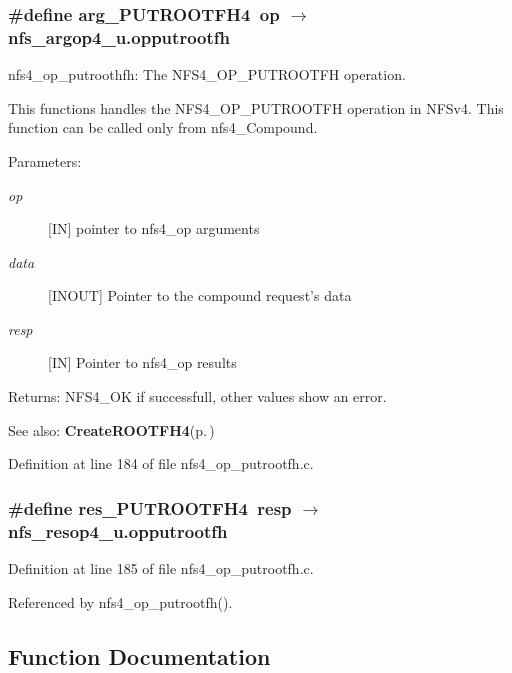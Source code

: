 \subsubsection{\setlength{\rightskip}{0pt plus 5cm}\#define arg\_\-PUTROOTFH4\ op $\rightarrow$ nfs\_\-argop4\_\-u.opputrootfh}\label{nfs4__op__putrootfh_8c_a0}


nfs4\_\-op\_\-putroothfh: The NFS4\_\-OP\_\-PUTROOTFH operation.

This functions handles the NFS4\_\-OP\_\-PUTROOTFH operation in NFSv4. This function can be called only from nfs4\_\-Compound.

\begin{Desc}
\item[Parameters:]
\begin{description}
\item[{\em op}][IN] pointer to nfs4\_\-op arguments \item[{\em data}][INOUT] Pointer to the compound request's data \item[{\em resp}][IN] Pointer to nfs4\_\-op results\end{description}
\end{Desc}
\begin{Desc}
\item[Returns:]NFS4\_\-OK if successfull, other values show an error.\end{Desc}
\begin{Desc}
\item[See also:]{\bf Create\-ROOTFH4}{\rm (p.\,\pageref{nfs4__op__putrootfh_8c_a2})} \end{Desc}


Definition at line 184 of file nfs4\_\-op\_\-putrootfh.c.
\subsubsection{\setlength{\rightskip}{0pt plus 5cm}\#define res\_\-PUTROOTFH4\ resp $\rightarrow$ nfs\_\-resop4\_\-u.opputrootfh}\label{nfs4__op__putrootfh_8c_a1}




Definition at line 185 of file nfs4\_\-op\_\-putrootfh.c.

Referenced by nfs4\_\-op\_\-putrootfh().

\subsection{Function Documentation}
